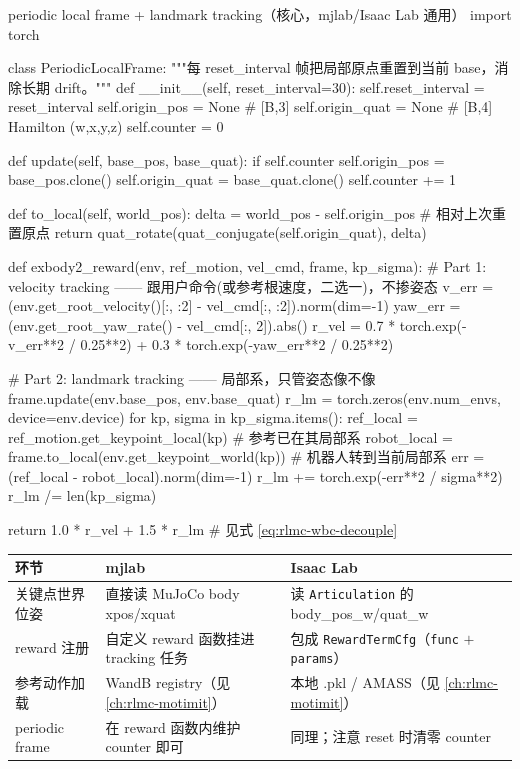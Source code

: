 \begin{codebox}[Python]{periodic local frame + landmark tracking（核心，mjlab/Isaac Lab 通用）}
import torch

class PeriodicLocalFrame:
    """每 reset_interval 帧把局部原点重置到当前 base，消除长期 drift。"""
    def __init__(self, reset_interval=30):
        self.reset_interval = reset_interval
        self.origin_pos = None       # [B,3]
        self.origin_quat = None      # [B,4] Hamilton (w,x,y,z)
        self.counter = 0

    def update(self, base_pos, base_quat):
        if self.counter %
            self.origin_pos = base_pos.clone()
            self.origin_quat = base_quat.clone()
        self.counter += 1

    def to_local(self, world_pos):
        delta = world_pos - self.origin_pos                      # 相对上次重置原点
        return quat_rotate(quat_conjugate(self.origin_quat), delta)

def exbody2_reward(env, ref_motion, vel_cmd, frame, kp_sigma):
    # Part 1: velocity tracking —— 跟用户命令(或参考根速度，二选一)，不掺姿态
    v_err = (env.get_root_velocity()[:, :2] - vel_cmd[:, :2]).norm(dim=-1)
    yaw_err = (env.get_root_yaw_rate() - vel_cmd[:, 2]).abs()
    r_vel = 0.7 * torch.exp(-v_err**2 / 0.25**2) + 0.3 * torch.exp(-yaw_err**2 / 0.25**2)

    # Part 2: landmark tracking —— 局部系，只管姿态像不像
    frame.update(env.base_pos, env.base_quat)
    r_lm = torch.zeros(env.num_envs, device=env.device)
    for kp, sigma in kp_sigma.items():
        ref_local   = ref_motion.get_keypoint_local(kp)          # 参考已在其局部系
        robot_local = frame.to_local(env.get_keypoint_world(kp)) # 机器人转到当前局部系
        err = (ref_local - robot_local).norm(dim=-1)
        r_lm += torch.exp(-err**2 / sigma**2)
    r_lm /= len(kp_sigma)

    return 1.0 * r_vel + 1.5 * r_lm                              # 见式 \eqref{eq:rlmc-wbc-decouple}
\end{codebox}

\begin{center}
\small
\begin{tabular}{p{2.0cm}p{4.3cm}p{4.3cm}}
\hline
环节 & mjlab & Isaac Lab \\
\hline
关键点世界位姿 & 直接读 MuJoCo body xpos/xquat & 读 \texttt{Articulation} 的 body\_pos\_w/quat\_w \\
reward 注册 & 自定义 reward 函数挂进 tracking 任务 & 包成 \texttt{RewardTermCfg}（\texttt{func} $+$ \texttt{params}） \\
参考动作加载 & WandB registry（见 \cref{ch:rlmc-motimit}） & 本地 .pkl / AMASS（见 \cref{ch:rlmc-motimit}） \\
periodic frame & 在 reward 函数内维护 counter 即可 & 同理；注意 reset 时清零 counter \\
\hline
\end{tabular}
\end{center}

